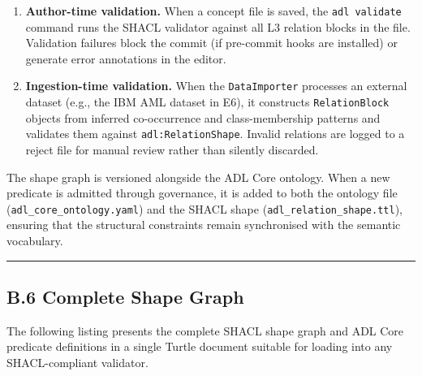\begin{enumerate}
\def\labelenumi{\arabic{enumi}.}
\item
  \textbf{Author-time validation.} When a concept file is saved, the \texttt{adl\ validate} command runs the SHACL validator against all L3 relation blocks in the file. Validation failures block the commit (if pre-commit hooks are installed) or generate error annotations in the editor.
\item
  \textbf{Ingestion-time validation.} When the \texttt{DataImporter} processes an external dataset (e.g., the IBM AML dataset in E6), it constructs \texttt{RelationBlock} objects from inferred co-occurrence and class-membership patterns and validates them against \texttt{adl:RelationShape}. Invalid relations are logged to a reject file for manual review rather than silently discarded.
\end{enumerate}

The shape graph is versioned alongside the ADL Core ontology. When a new predicate is admitted through governance, it is added to both the ontology file (\texttt{adl\_core\_ontology.yaml}) and the SHACL shape (\texttt{adl\_relation\_shape.ttl}), ensuring that the structural constraints remain synchronised with the semantic vocabulary.

\begin{center}\rule{0.5\linewidth}{0.5pt}\end{center}


\subsection{B.6 Complete Shape Graph}\label{b.6-complete-shape-graph}

The following listing presents the complete SHACL shape graph and ADL Core predicate definitions in a single Turtle document suitable for loading into any SHACL-compliant validator.

